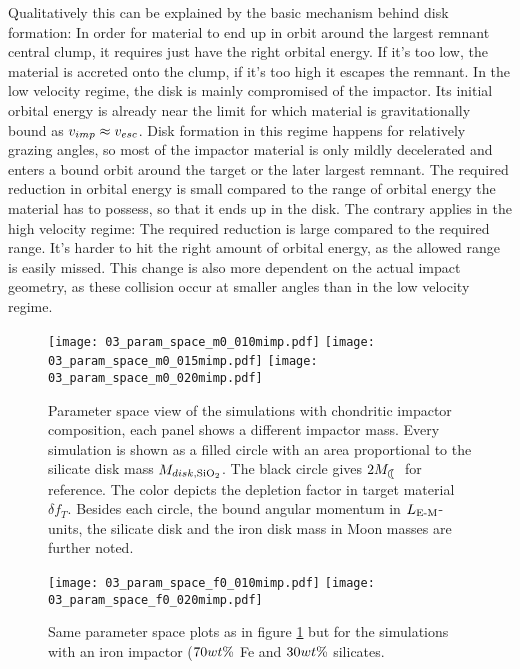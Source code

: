 Qualitatively this can be explained by the basic mechanism behind disk formation: In order for material to end up in orbit around the largest remnant central clump, it requires just have the right orbital energy. If it's too low, the material is accreted onto the clump, if it's too high it escapes the remnant. In the low velocity regime, the disk is mainly compromised of the impactor. Its initial orbital energy is already near the limit for which material is gravitationally bound as $v_{imp} \approx v_{esc}$. Disk formation in this regime happens for relatively grazing angles, so most of the impactor material is only mildly decelerated and enters a bound orbit around the target or the later largest remnant. The required reduction in orbital energy is small compared to the range of orbital energy the material has to possess, so that it ends up in the disk. The contrary applies in the high velocity regime: The required reduction is large compared to the required range. It's harder to hit the right amount of orbital energy, as the allowed range is easily missed. This change is also more dependent on the actual impact geometry, as these collision occur at smaller angles than in the low velocity regime.

\begin{figure}
\begin{center}
\texttt{[image: 03\_param\_space\_m0\_010mimp.pdf]}
\texttt{[image: 03\_param\_space\_m0\_015mimp.pdf]}
\texttt{[image: 03\_param\_space\_m0\_020mimp.pdf]}
\caption{Parameter space view of the simulations with chondritic impactor composition, each panel shows a different impactor mass. Every simulation is shown as a filled circle with an area proportional to the silicate disk mass $M_{disk, \mathrm{SiO}_2}$. The black circle gives $2 \ML$ for reference. The color depicts the depletion factor in target material $\delta f_T$. Besides each circle, the bound angular momentum in $L_{\textrm{E-M}}$-units, the silicate disk and the iron disk mass in Moon masses are further noted.}
\label{ch05_fig03a}
\end{center}
\end{figure}

\begin{figure}
\begin{center}
\texttt{[image: 03\_param\_space\_f0\_010mimp.pdf]}
\texttt{[image: 03\_param\_space\_f0\_020mimp.pdf]}
\caption{Same parameter space plots as in figure \ref{ch05_fig03a} but for the simulations with an iron impactor ($70 wt\mathrm{\%}$ Fe and $30 wt\mathrm{\%}$ silicates.}
\label{ch05_fig03b}
\end{center}
\end{figure}

